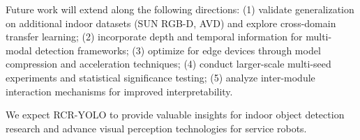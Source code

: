 \documentclass[journal]{IEEEtran}
\begin{document}
Future work will extend along the following directions: (1) validate generalization on additional indoor datasets (SUN RGB-D, AVD) and explore cross-domain transfer learning; (2) incorporate depth and temporal information for multi-modal detection frameworks; (3) optimize for edge devices through model compression and acceleration techniques; (4) conduct larger-scale multi-seed experiments and statistical significance testing; (5) analyze inter-module interaction mechanisms for improved interpretability.

We expect RCR-YOLO to provide valuable insights for indoor object detection research and advance visual perception technologies for service robots.



\end{document}
